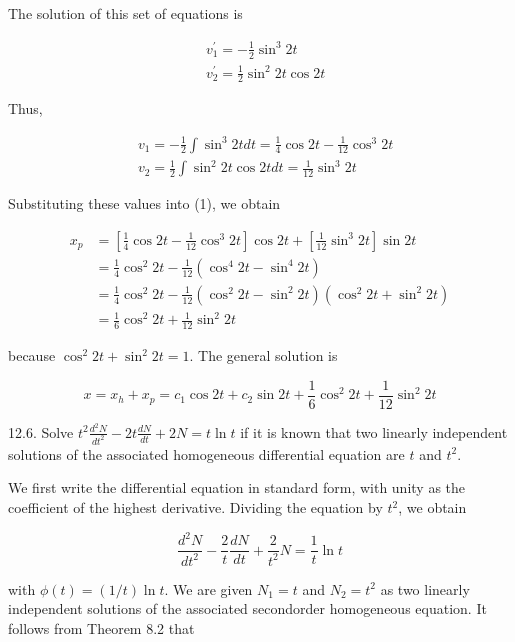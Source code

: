 \documentclass[10pt]{article}
\begin{document}
The solution of this set of equations is

$$
\begin{aligned}
& v_{1}^{\prime}=-\frac{1}{2} \sin ^{3} 2 t \\
& v_{2}^{\prime}=\frac{1}{2} \sin ^{2} 2 t \cos 2 t
\end{aligned}
$$

Thus,

$$
\begin{aligned}
& v_{1}=-\frac{1}{2} \int \sin ^{3} 2 t d t=\frac{1}{4} \cos 2 t-\frac{1}{12} \cos ^{3} 2 t \\
& v_{2}=\frac{1}{2} \int \sin ^{2} 2 t \cos 2 t d t=\frac{1}{12} \sin ^{3} 2 t
\end{aligned}
$$

Substituting these values into (1), we obtain

$$
\begin{aligned}
x_{p} & =\left[\frac{1}{4} \cos 2 t-\frac{1}{12} \cos ^{3} 2 t\right] \cos 2 t+\left[\frac{1}{12} \sin ^{3} 2 t\right] \sin 2 t \\
& =\frac{1}{4} \cos ^{2} 2 t-\frac{1}{12}\left(\cos ^{4} 2 t-\sin ^{4} 2 t\right) \\
& =\frac{1}{4} \cos ^{2} 2 t-\frac{1}{12}\left(\cos ^{2} 2 t-\sin ^{2} 2 t\right)\left(\cos ^{2} 2 t+\sin ^{2} 2 t\right) \\
& =\frac{1}{6} \cos ^{2} 2 t+\frac{1}{12} \sin ^{2} 2 t
\end{aligned}
$$

because $\cos ^{2} 2 t+\sin ^{2} 2 t=1$. The general solution is

$$
x=x_{h}+x_{p}=c_{1} \cos 2 t+c_{2} \sin 2 t+\frac{1}{6} \cos ^{2} 2 t+\frac{1}{12} \sin ^{2} 2 t
$$

12.6. Solve $t^{2} \frac{d^{2} N}{d t^{2}}-2 t \frac{d N}{d t}+2 N=t \ln t$ if it is known that two linearly independent solutions of the associated homogeneous differential equation are $t$ and $t^{2}$.

We first write the differential equation in standard form, with unity as the coefficient of the highest derivative. Dividing the equation by $t^{2}$, we obtain

$$
\frac{d^{2} N}{d t^{2}}-\frac{2}{t} \frac{d N}{d t}+\frac{2}{t^{2}} N=\frac{1}{t} \ln t
$$

with $\phi(t)=(1 / t) \ln t$. We are given $N_{1}=t$ and $N_{2}=t^{2}$ as two linearly independent solutions of the associated secondorder homogeneous equation. It follows from Theorem 8.2 that
\end{document}
